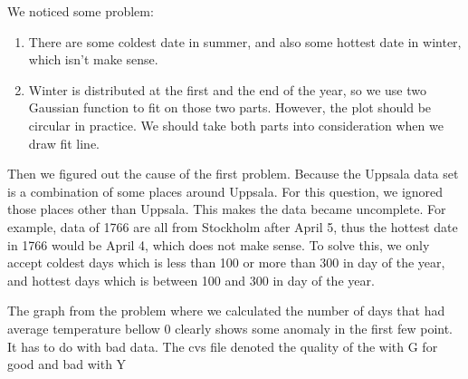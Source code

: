 \documentclass[a4paper]{article}
\begin{document}
We noticed some problem:
\begin{enumerate}
\item There are some coldest date in summer, and also some hottest date in winter, which isn't make sense.
\item Winter is distributed at the first and the end of the year, so we use two Gaussian function to fit on those two parts. However, the plot should be circular in practice. We should take both parts into consideration when we draw fit line.
\end{enumerate}
Then we figured out the cause of the first problem. Because the Uppsala data set is a combination of some places around Uppsala. For this question, we ignored those places other than Uppsala. This makes the data became uncomplete. For example, data of 1766 are all from Stockholm after April 5, thus the hottest date in 1766 would be April 4, which does not make sense. To solve this, we only accept coldest days which is less than 100 or more than 300 in day of the year, and hottest days which is between 100 and 300 in day of the year.




The graph from the problem where we calculated the number of days that had average temperature bellow 0 clearly shows some anomaly in the first few point. It has to do with bad data. The cvs file denoted the quality of the with G for good and bad with Y 
\end{document}
